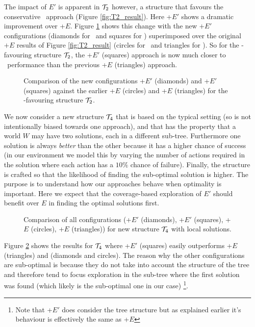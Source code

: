 The impact of $E'$ is apparent in ${\mathcal{T}}_2$ however, a structure that favours the conservative \BUL\ approach (Figure \ref{fig:T2_result}). Here \CL+$E'$ shows a dramatic improvement over \CL+$E$. Figure \ref{fig:T2_result2} shows this change with the new $+E'$ configurations (diamonds for \BUL\ and squares for \CL) superimposed over the original $+E$ results of Figure \ref{fig:T2_result} (circles for \BUL\ and triangles for \CL). So for the \BUL-favouring structure ${\mathcal{T}}_2$, the \CL+$E'$ (squares) approach is now much closer to \BUL\ performance than the previous \CL+$E$ (triangles) approach.

\begin{figure}[ht]
\begin{center}

\end{center}
\caption{Comparison of the new configurations \BUL+$E'$ (diamonds) and \CL+$E'$ (squares) against the earlier \BUL+$E$ (circles) and \CL+$E$ (triangles) for the \BUL-favouring structure ${\mathcal{T}}_2$.}
\label{fig:T2_result2}
\end{figure}

We now consider a new structure ${\mathcal{T}}_4$ that is based on the typical setting (so is not intentionally biased towards one approach), and that has the property that a world $W$ may have two solutions, each in a different sub-tree. Furthermore one solution is always \textit{better} than the other because it has a higher chance of success (in our environment we model this by varying the number of actions required in the solution where each action has a $10\%$ chance of failure). Finally, the structure is crafted so that the likelihood of finding the sub-optimal solution is higher. The purpose is to understand how our approaches behave when optimality is important. Here we expect that the coverage-based exploration of $E'$ should benefit over $E$ in finding the optimal solutions first. 

\begin{figure}[ht]
\begin{center}

\end{center}
\caption{Comparison of all configurations (\BUL+$E'$ (diamonds), \CL+$E'$ (squares), \BUL+$E$ (circles), \CL+$E$ (triangles)) for new structure ${\mathcal{T}}_4$ with local solutions.}
\label{fig:T4_result}
\end{figure}

Figure \ref{fig:T4_result} shows the results for ${\mathcal{T}}_4$ where \CL+$E'$ (squares) easily outperforms \CL+$E$ (triangles) and \BUL (diamonds and circles). The reason why the other configurations are sub-optimal is because they do not take into account the structure of the tree and therefore tend to focus exploration in the sub-tree where the first solution was found (which likely is the sub-optimal one in our case) \footnote{Note that \BUL+$E'$ does consider the tree structure but as explained earlier it's behaviour is effectively the same as \BUL+$E$}.


